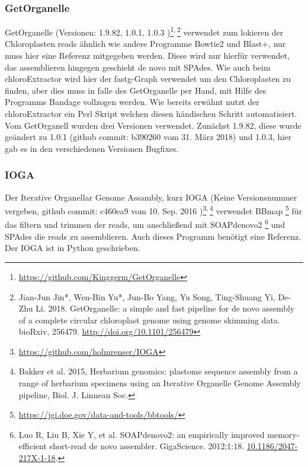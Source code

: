 \documentclass{scrartcl}
\begin{document}
\subsubsection{GetOrganelle}
\label{sec-2-5-5}
GetOrganelle (Versionen: 1.9.82, 1.0.1, 1.0.3 )\footnote{\url{https://github.com/Kinggerm/GetOrganelle}}\textsuperscript{,}\,\footnote{Jian-Jun Jin*, Wen-Bin Yu*, Jun-Bo Yang, Yu Song, Ting-Shuang Yi, De-Zhu Li. 2018. GetOrganelle: a simple and fast pipeline for de novo assembly of a complete circular chloroplast genome using genome skimming data. bioRxiv, 256479. \url{http://doi.org/10.1101/256479}} verwendet zum lokieren der Chloroplasten reads ähnlich wie andere Programme Bowtie2 \footnotemark[12]{} und Blast+, nur muss hier eine Referenz mitgegeben werden. Diese wird nur hierfür
verwendet, das assemblieren hingegen geschieht de novo mit SPAdes. Wie auch beim chloroExtractor wird hier der fastg-Graph verwendet um den Chloroplasten zu finden, aber dies muss in falle 
des GetOrganelle per Hand, mit Hilfe des Programms Bandage vollzogen werden. Wie bereits erwähnt nutzt der chloroExtractor ein Perl Skript welchen diesen händischen Schritt automatisiert. 
Vom GetOrganell wurden drei Versionen verwendet. Zunächst 1.9.82, diese wurde geändert zu 1.0.1 (github commit: b390260 vom 31. März 2018) und 1.0.3, hier gab es in den verschiedenen Versionen Bugfixes.
\subsubsection{IOGA}
\label{sec-2-5-6}
Der Iterative Organellar Genome Assambly, kurz IOGA (Keine Versionsnummer vergeben, github commit: c460ea9 vom 10. Sep. 2016 )\footnote{\url{https://github.com/holmrenser/IOGA}}\textsuperscript{,}\,\footnote{Bakker et al. 2015, Herbarium genomics: plastome sequence assembly from a range of herbarium specimens using an Iterative Organelle Genome Assembly pipeline, Biol. J. Linnean Soc.} verwendet BBmap \footnote{\url{https://jgi.doe.gov/data-and-tools/bbtools/}} für das filtern und trimmen der reads, um anschließend mit SOAPdenovo2 \footnote{Luo R, Liu B, Xie Y, et al. SOAPdenovo2: an empirically improved memory-efficient short-read de novo assembler. GigaScience. 2012;1:18. \url{10.1186/2047-217X-1-18}.} und SPAdes \footnotemark[13]{} die reads zu assemblieren. 
Auch dieses Programm benötigt eine Referenz. Der IOGA ist in Python geschrieben.
\end{document}
